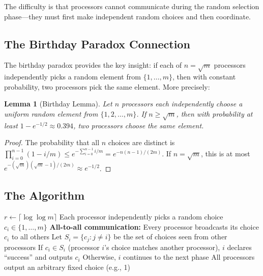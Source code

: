 \documentclass[twoside,12pt]{book}
\theoremstyle{plain}
\newtheorem{lemma}[theorem]{Lemma}
\theoremstyle{definition}
\theoremstyle{remark}
\begin{document}
The difficulty is that processors cannot communicate during the random selection phase---they must first make independent random choices and then coordinate.

\subsection{The Birthday Paradox Connection}
\label{subsec:birthday-connection}

The birthday paradox provides the key insight: if each of $n = \sqrt{m}$ processors independently picks a random element from $\{1, \ldots, m\}$, then with constant probability, two processors pick the same element. More precisely:

\begin{lemma}[Birthday Lemma]
\label{lem:birthday}
Let $n$ processors each independently choose a uniform random element from $\{1, 2, \ldots, m\}$. If $n \geq \sqrt{m}$, then with probability at least $1 - e^{-1/2} \approx 0.394$, two processors choose the same element.
\end{lemma}

\begin{proof}
The probability that all $n$ choices are distinct is $\prod_{i=0}^{n-1}(1 - i/m) \leq e^{-\sum_{i=0}^{n-1} i/m} = e^{-n(n-1)/(2m)}$. If $n = \sqrt{m}$, this is at most $e^{-(\sqrt{m})(\sqrt{m}-1)/(2m)} \approx e^{-1/2}$.
\end{proof}

\subsection{The Algorithm}
\label{subsec:choice-algorithm}

\begin{algorithm}[H]
\caption{Choice Coordination Algorithm}
\label{alg:choice}
\begin{algorithmic}[1]
\State $r \leftarrow \lceil \log \log m \rceil$ 
\State Each processor independently picks a random choice $c_i \in \{1, \ldots, m\}$
\State \textbf{All-to-all communication:} Every processor broadcasts its choice $c_i$ to all others
\State Let $S_i = \{c_j : j \neq i\}$ be the set of choices seen from other processors
\State If $c_i \in S_i$ (processor $i$'s choice matches another processor), $i$ declares ``success'' and outputs $c_i$
\State Otherwise, $i$ continues to the next phase
\EndFor
{}
\State All processors output an arbitrary fixed choice (e.g., 1)
\EndIf
\EndProcedure
\end{algorithmic}
\end{algorithm}
\end{document}
